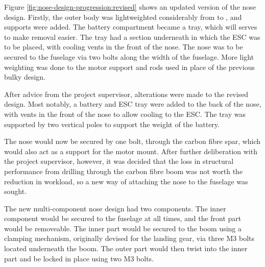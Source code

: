 \documentclass[../../main.tex]{subfiles}
\begin{document}

Figure \ref{fig:nose-design-progression:revised} shows an updated version of the nose design.
Firstly, the outer body was lightweighted considerably from  to , and supports were added.
The battery compartment became a tray, which will serves to make removal easier.
The tray had a section underneath in which the ESC was to be placed, with cooling vents in the front of the nose.
The nose was to be secured to the fuselage via two bolts along the width of the fuselage.
More light weighting was done to the motor support and rods used in place of the previous bulky design. 


After advice from the project supervisor, alterations were made to the revised design.
Most notably, a battery and ESC tray were added to the back of the nose, with vents in the front of the nose to allow cooling to the ESC.
The tray was supported by two vertical poles to support the weight of the battery. 


The nose would now be secured by one bolt, through the carbon fibre spar, which would also act as a support for the motor mount.
After further deliberation with the project supervisor, however, it was decided that the loss in structural performance from drilling through the carbon fibre boom was not worth the reduction in workload, so a new way of attaching the nose to the fuselage was sought.  

The new multi-component nose design had two components.
The inner component would be secured to the fuselage at all times, and the front part would be removeable.
The inner part would be secured to the boom using a clamping mechanism, originally devised for the landing gear, via three M3 bolts located underneath the boom.
The outer part would then twist into the inner part and be locked in place using two M3 bolts. 
\end{document}
